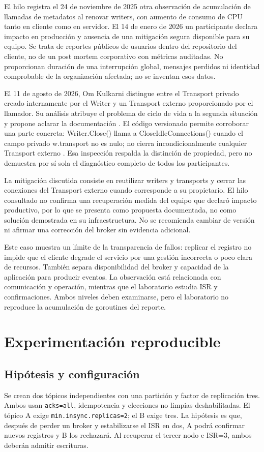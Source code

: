 \documentclass[11pt,a4paper]{article}
\begin{document}
El hilo registra el 24 de noviembre de 2025 otra observación de acumulación de llamadas de metadatos al renovar writers, con aumento de consumo de CPU tanto en cliente como en servidor. El 14 de enero de 2026 un participante declara impacto en producción y ausencia de una mitigación segura disponible para su equipo. Se trata de reportes públicos de usuarios dentro del repositorio del cliente, no de un post mortem corporativo con métricas auditadas. No proporcionan duración de una interrupción global, mensajes perdidos ni identidad comprobable de la organización afectada; no se inventan esos datos.

El 11 de agosto de 2026, Om Kulkarni distingue entre el Transport privado creado internamente por el Writer y un Transport externo proporcionado por el llamador. Su análisis atribuye el problema de ciclo de vida a la segunda situación y propone aclarar la documentación \cite{kulkarni2026comment}. El código versionado permite corroborar una parte concreta: Writer.Close() llama a CloseIdleConnections() cuando el campo privado w.transport no es nulo; no cierra incondicionalmente cualquier Transport externo \cite{kafkagowriter047}. Esa inspección respalda la distinción de propiedad, pero no demuestra por sí sola el diagnóstico completo de todos los participantes.

La mitigación discutida consiste en reutilizar writers y transports y cerrar las conexiones del Transport externo cuando corresponde a su propietario. El hilo consultado no confirma una recuperación medida del equipo que declaró impacto productivo, por lo que se presenta como propuesta documentada, no como solución demostrada en su infraestructura. No se recomienda cambiar de versión ni afirmar una corrección del broker sin evidencia adicional.

Este caso muestra un límite de la transparencia de fallos: replicar el registro no impide que el cliente degrade el servicio por una gestión incorrecta o poco clara de recursos. También separa disponibilidad del broker y capacidad de la aplicación para producir eventos. La observación está relacionada con comunicación y operación, mientras que el laboratorio estudia ISR y confirmaciones. Ambos niveles deben examinarse, pero el laboratorio no reproduce la acumulación de goroutines del reporte.

\section{Experimentación reproducible}
\subsection{Hipótesis y configuración}
Se crean dos tópicos independientes con una partición y factor de replicación tres. Ambos usan \texttt{acks=all}, idempotencia y elecciones no limpias deshabilitadas. El tópico A exige \texttt{min.insync.replicas=2}; el B exige tres. La hipótesis es que, después de perder un broker y estabilizarse el ISR en dos, A podrá confirmar nuevos registros y B los rechazará. Al recuperar el tercer nodo e ISR=3, ambos deberán admitir escrituras.
\end{document}
